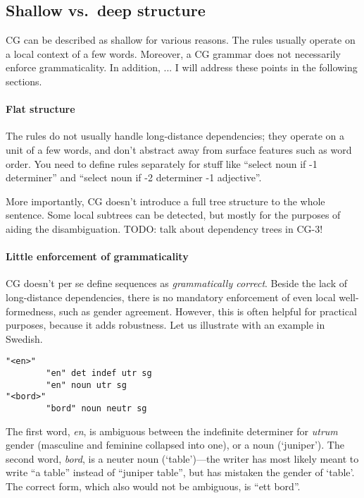 \subsection*{Shallow vs.~deep structure}\label{shallow-vs.deep-structure}

CG can be described as shallow for various reasons. The rules usually
operate on a local context of a few words. Moreover, a CG grammar does
not necessarily enforce grammaticality.
In addition, ...
I will address these points in the following sections.


\paragraph{Flat structure} The rules do not usually handle 
long-distance dependencies; they operate on a unit of a few words, and
don't abstract away from surface features such as word order.
You need to define rules separately for stuff like ``select noun if -1
determiner'' and ``select noun if -2 determiner -1 adjective''.

More importantly, CG doesn't introduce a full tree structure to the
whole sentence. Some local subtrees can be detected, but mostly
for the purposes of aiding the disambiguation.
TODO: talk about dependency trees in CG-3!
 
\paragraph{Little enforcement of grammaticality} CG doesn't
per se define sequences as \emph{grammatically correct}.
Beside the lack of long-distance dependencies, there is
no mandatory enforcement of even local well-formedness, such as gender agreement.
However, this is often helpful for practical purposes, because it adds robustness.
Let us illustrate with an example in Swedish.

\begin{verbatim}
"<en>"
        "en" det indef utr sg
        "en" noun utr sg 
"<bord>"
        "bord" noun neutr sg
\end{verbatim}

The first word, \emph{en}, is ambiguous between the indefinite determiner for
\emph{utrum} gender  (masculine and feminine collapsed into one), or a noun (`juniper').
The second word, \emph{bord}, is a neuter noun (`table')---the writer has
most likely meant to write ``a table'' instead of ``juniper table'', but has mistaken the gender of `table'. The correct form, which also would not be ambiguous, is ``ett bord''.

